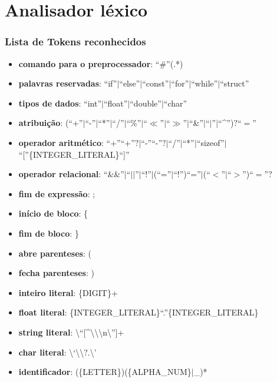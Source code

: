 \documentclass[12pt]{beamer}
\begin{document}
\section[Analisador]{Analisador léxico}\label{Analisádor léxico}
\begin{frame}[allowframebreaks]
    \frametitle{Lista de Tokens reconhecidos}
    \begin{itemize}
        \item\textbf{comando para o preprocessador}: ``\#''(.*)
        \item\textbf{palavras reservadas}: ``if''$|$``else''$|$``const''$|$``for''$|$``while''$|$``struct''
        \item\textbf{tipos de dados}: ``int''$|$``float''$|$``double''$|$``char''
        \item\textbf{atribuição}: (``+''$|$``-''$|$``*''$|$``/''$|$``\%''$|$``$\ll$''$|$``$\gg$''$|$``\&''$|$``$|$''$|$``^'')$?$``$=$''
        \item\textbf{operador aritmético}: ``+''``+''$?|$``-''``-''$?|$``/''$|$``*''$|$``sizeof''$|$``[''\{INTEGER\_LITERAL\}``]''
        \item\textbf{operador relacional}: ``\&\&''$|$``$||$''$|$``!''$|$(``=''$|$``!'')``=''$|$(``$<$''$|$``$>$'')``$=$''$?$
        \item\textbf{fim de expressão}: ;
        \item\textbf{início de bloco}: \{
        \item\textbf{fim de bloco}: \}
        \item\textbf{abre parenteses}: (
        \item\textbf{fecha parenteses}: )
        \item\textbf{inteiro literal}: \{DIGIT\}+
        \item\textbf{float literal}: \{INTEGER\_LITERAL\}``.''\{INTEGER\_LITERAL\}
        \item\textbf{string literal}: \textbackslash{}``[\^{}\textbackslash{}\textbackslash{}\textbackslash{}n\textbackslash{}'']+
        \item\textbf{char literal}: \textbackslash{}`\textbackslash{}\textbackslash{}$?$.\textbackslash{}'
        \item\textbf{identificador}: (\{LETTER\})(\{ALPHA\_NUM\}$|$\_)*
    \end{itemize}
\end{frame}
\end{document}

